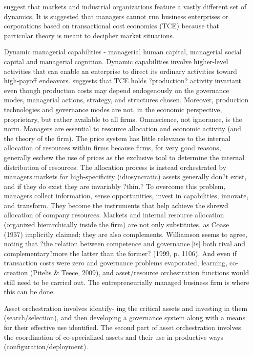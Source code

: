 \documentclass[12pt,letterpaper]{article}
\begin{document}
\cite{Moran1996} suggest that markets and industrial organizations feature a vastly different set of dynamics. It is suggested that managers cannot run business enterprises or corporations based on transactional cost economics (TCE) because that particular theory is meant to decipher market situations.

Dynamic managerial capabilities \cite{Adner2003} - managerial human capital, managerial social capital and managerial cognition. Dynamic capabilities involve higher-level activities that can enable an enterprise to direct its ordinary activities toward high-payoff endeavors. \cite{Teece2014b} suggests that TCE holds ?production? activity invariant even though production costs may depend endogenously on the governance modes, managerial actions, strategy, and structures chosen. Moreover, production technologies and governance modes are not, in the economic perspective, proprietary, but rather available to all firms. Omniscience, not ignorance, is the norm. Managers are essential to resource allocation and
economic activity (and the theory of the firm). The price system has little relevance to the internal allocation of resources within firms because firms, for very good reasons, generally eschew the use of prices as the exclusive tool to determine the internal distribution of resources. The allocation process is instead orchestrated by managers.markets for high-specificity (idiosyncratic) assets generally don?t exist, and if they do exist they are invariably ?thin.? To overcome this problem, managers collect information, sense opportunities, invest in capabilities, innovate, and transform. They become the instruments that help achieve the shrewd allocation of company resources. Markets and internal resource allocation (organized hierarchically inside the
firm) are not only substitutes, as Coase (1937) implicitly claimed; they are also complements. Williamson seems to agree, noting that ?the relation between competence and governance [is] both rival and complementary?more the latter than the former?
(1999, p. 1106). And even if transaction costs were zero and governance problems evaporated, learning, co-creation (Pitelis \& Teece, 2009), and asset/resource orchestration functions would still need to be carried out. The entrepreneurially managed business firm is where this can be done.

Asset orchestration involves identify- ing the critical assets and investing in them (search/selection), and then developing a governance system along with a means for their effective use identified. The second part of asset orchestration involves the coordination of co-specialized assets and their use in productive ways (configuration/deployment).
\end{document}
